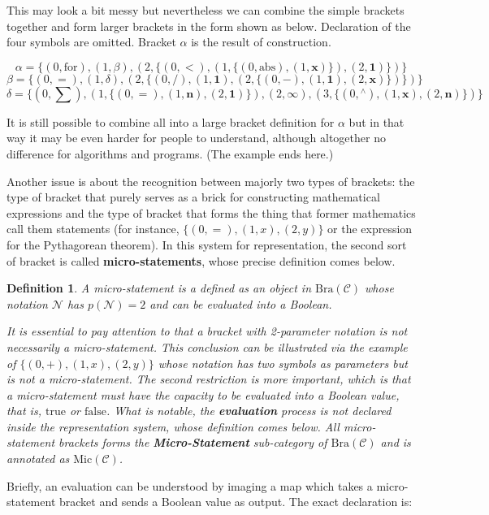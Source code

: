 \documentclass{article}
\newtheorem{definition}{Definition}	%
\numberwithin{theorem}{section}	%
\numberwithin{axiom}{section}	%
\numberwithin{definition}{section}	%
\begin{document}
This may look a bit messy but nevertheless we can combine the simple brackets together and form larger brackets in the form shown as below. Declaration of the four symbols are omitted. Bracket \(\alpha\) is the result of construction.

\[\alpha =\{(0,\text{for}),(1,\beta ),(2,\{(0,<),(1,\{(0,\text{abs}),(1,\pmb{x})\}),(2,\pmb{1})\})\}\]
\[\beta =\{(0,=),(1,\delta ),(2,\{(0,/),(1,\pmb{1}),(2,\{(0,-),(1,\pmb{1}),(2,\pmb{x})\})\})\}\]
\[\delta =\{(0,\sum ),(1,\{(0,=),(1,\pmb{n}),(2,\pmb{1})\}),(2,\pmb{\infty }), (3,\{(0,{}^{\wedge}),(1,\pmb{x}),(2,\pmb{n})\})\}\]

It is still possible to combine all into a large bracket definition for \(\alpha\) but in that way it may be even harder for people to understand, although altogether no difference for algorithms and programs. (The example ends here.)

Another issue is about the recognition between majorly two types of brackets: the type of bracket that purely serves as a brick for constructing mathematical expressions and the type of bracket that forms the thing that former mathematics call them statements (for instance, \(\{(0,=),(1,x),(2,y)\}\) or the expression for the Pythagorean theorem). In this system for representation, the second sort of bracket is called \textbf{ micro-statements}, whose precise definition comes below.

\begin{definition}
	A micro-statement is a defined as an object in \(\text{Bra}(\mathcal{C})\) whose notation \(\mathcal{N}\) has \(\mathit{p}(\mathcal{N})=2\) and can be evaluated into a Boolean.
	
	It is essential to pay attention to that a bracket with 2-parameter notation is not necessarily a micro-statement. This conclusion can be illustrated via the example of \(\{(0,+),(1,x),(2,y)\}\) whose notation has two symbols as parameters but is not a micro-statement. The second restriction is more important, which is that a micro-statement must have the capacity to be evaluated into a Boolean value, that is, \(\text{true}\) or \(\text{false}\). What is notable, the \textbf{ evaluation} process is not declared inside the representation system, whose definition comes below. All micro-statement brackets forms the \textbf{ Micro-Statement }sub-category of \(\text{Bra}(\mathcal{C})\) and is annotated as \(\text{Mic}(\mathcal{C})\).
\end{definition}

 Briefly, an evaluation can be understood by imaging a map which takes a micro-statement bracket and sends a Boolean value as output. The exact declaration is:
\end{document}

